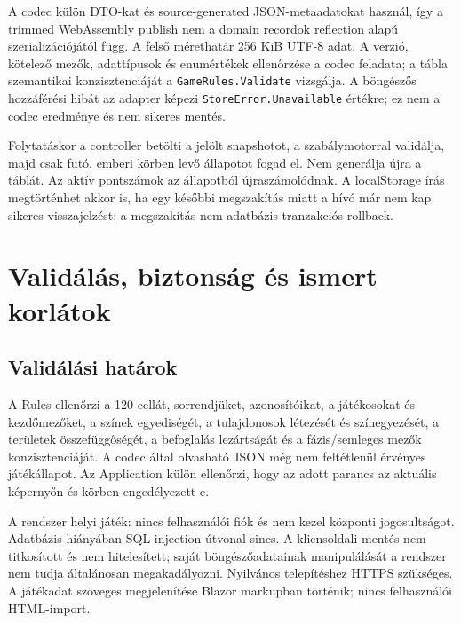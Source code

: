\documentclass[11pt,a4paper]{article}
\newcommand{\code}[1]{\nolinkurl{#1}}
\begin{document}
A codec külön DTO-kat és source-generated JSON-metaadatokat használ, így a trimmed WebAssembly publish nem a domain recordok reflection alapú szerializációjától függ. A felső mérethatár 256 KiB UTF-8 adat. A verzió, kötelező mezők, adattípusok és enumértékek ellenőrzése a codec feladata; a tábla szemantikai konzisztenciáját a \code{GameRules.Validate} vizsgálja. A böngészős hozzáférési hibát az adapter képezi \code{StoreError.Unavailable} értékre; ez nem a codec eredménye és nem sikeres mentés.

Folytatáskor a controller betölti a jelölt snapshotot, a szabálymotorral validálja, majd csak futó, emberi körben levő állapotot fogad el. Nem generálja újra a táblát. Az aktív pontszámok az állapotból újraszámolódnak. A localStorage írás megtörténhet akkor is, ha egy későbbi megszakítás miatt a hívó már nem kap sikeres visszajelzést; a megszakítás nem adatbázis-tranzakciós rollback.

\section{Validálás, biztonság és ismert korlátok}
\subsection{Validálási határok}
A Rules ellenőrzi a 120 cellát, sorrendjüket, azonosítóikat, a játékosokat és kezdőmezőket, a színek egyediségét, a tulajdonosok létezését és színegyezését, a területek összefüggőségét, a befoglalás lezártságát és a fázis/semleges mezők konzisztenciáját. A codec által olvasható JSON még nem feltétlenül érvényes játékállapot. Az Application külön ellenőrzi, hogy az adott parancs az aktuális képernyőn és körben engedélyezett-e.

A rendszer helyi játék: nincs felhasználói fiók és nem kezel központi jogosultságot. Adatbázis hiányában SQL injection útvonal sincs. A kliensoldali mentés nem titkosított és nem hitelesített; saját böngészőadatainak manipulálását a rendszer nem tudja általánosan megakadályozni. Nyilvános telepítéshez HTTPS szükséges. A játékadat szöveges megjelenítése Blazor markupban történik; nincs felhasználói HTML-import.
\end{document}
